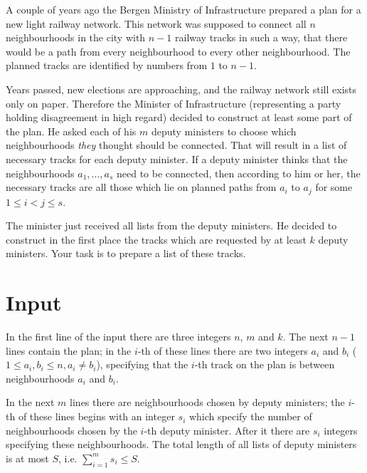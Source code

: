 
\noindent
A couple of years ago the Bergen Ministry of Infrastructure prepared a plan for a new light railway network. This network was supposed to connect all $n$ neighbourhoods in the city with $n - 1$ railway tracks in such a way, that there would be a path from every neighbourhood to every other neighbourhood. The planned tracks are identified by numbers from $1$ to $n - 1$.

Years passed, new elections are approaching, and the railway network still exists only on paper. Therefore the Minister of Infrastructure (representing a party holding disagreement in high regard) decided to construct at least some part of the plan. He asked each of his $m$ deputy ministers to choose which neighbourhoods \emph{they} thought should be connected. That will result in a list of necessary tracks for each deputy minister. If a deputy minister thinks that the neighbourhoods $a_1, \ldots, a_s$ need to be connected, then according to him or her, the necessary tracks are all those which lie on planned paths from $a_i$ to $a_j$ for some $1 \leq i < j \leq s$.

The minister just received all lists from the deputy ministers. He decided to construct in the first place the tracks which are requested by at least $k$ deputy ministers. Your task is to prepare a list of these tracks.

\section*{Input}

In the first line of the input there are three integers $n$, $m$ and $k$. The next $n - 1$ lines contain the plan; in the $i$-th of these lines there are two integers $a_i$ and $b_i$ ($1 \leq a_i, b_i \leq n, a_i \neq b_i$), specifying that the $i$-th track on the plan is between neighbourhoods $a_i$ and $b_i$.

In the next $m$ lines there are neighbourhoods chosen by deputy ministers; the $i$-th of these lines begins with an integer $s_i$ which specify the number of neighbourhoods chosen by the $i$-th deputy minister. After it there are $s_i$ integers specifying these neighbourhoods. The total length of all lists of deputy ministers is at most $S$, i.e. $\sum_{i=1}^{m}s_i \leq S$.

